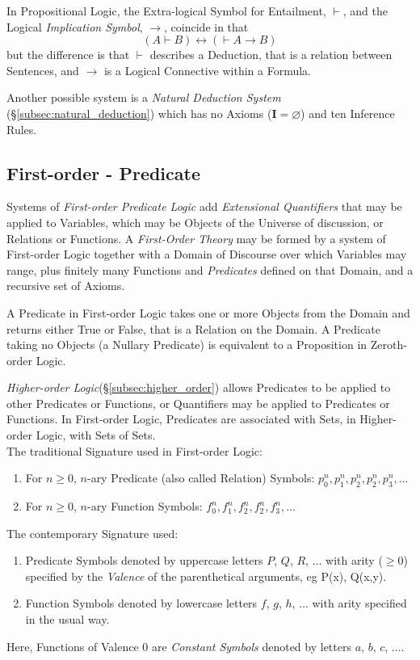 \documentclass{article}
\begin{document}
In Propositional Logic, the Extra-logical Symbol for Entailment,
$\vdash$, and the Logical \emph{Implication Symbol}, $\rightarrow$,
coincide in that
\[(A \vdash B) \leftrightarrow (\vdash A \rightarrow B)\]
but the difference is that $\vdash$ describes a Deduction, that is a
relation between Sentences, and $\rightarrow$ is a Logical Connective
within a Formula.

Another possible system is a \emph{Natural Deduction
  System}\cite{jaskowski34} (\S \ref{subsec:natural_deduction})
which has no Axioms ($\mathbf{I}=\varnothing$) and ten Inference
Rules.

\subsection{First-order - Predicate}\label{subsec:predicate_logic}

Systems of \emph{First-order Predicate Logic} add \emph{Extensional
  Quantifiers} that may be applied to Variables, which may be Objects
of the Universe of discussion, or Relations or Functions. A
\emph{First-Order Theory} may be formed by a system of First-order
Logic together with a Domain of Discourse over which Variables may
range, plus finitely many Functions and \emph{Predicates} defined on
that Domain, and a recursive set of Axioms.

A Predicate in First-order Logic takes one or more Objects from the
Domain and returns either True or False, that is a Relation on the
Domain. A Predicate taking no Objects (a Nullary Predicate) is
equivalent to a Proposition in Zeroth-order Logic.

\emph{Higher-order Logic}(\S\ref{subsec:higher_order}) allows Predicates
to be applied to other Predicates or Functions, or Quantifiers may be
applied to Predicates or Functions. In First-order Logic, Predicates
are associated with Sets, in Higher-order Logic, with Sets of
Sets.
\\
The traditional Signature used in First-order Logic:
\begin{enumerate}
\item For $n \geq 0$, $n$-ary Predicate (also called Relation)
  Symbols: $p^{n}_0, p^{n}_1, p^{n}_2, p^{n}_2, p^{n}_3, \ldots$
\item For $n \geq 0$, $n$-ary Function Symbols: $f^{n}_0, f^{n}_1,
  f^{n}_2, f^{n}_2, f^{n}_3, \ldots$
\end{enumerate}
The contemporary Signature used:
\begin{enumerate}
\item Predicate Symbols denoted by uppercase letters $P$, $Q$, $R$,
  $\ldots$ with arity ($\geq 0$) specified by the \emph{Valence} of the
  parenthetical arguments, eg P(x), Q(x,y).
\item Function Symbols denoted by lowercase letters $f$, $g$, $h$,
  $\ldots$ with arity specified in the usual way.
\end{enumerate}
Here, Functions of Valence 0 are \emph{Constant Symbols} denoted by
letters $a$, $b$, $c$, $\ldots$.
\end{document}
